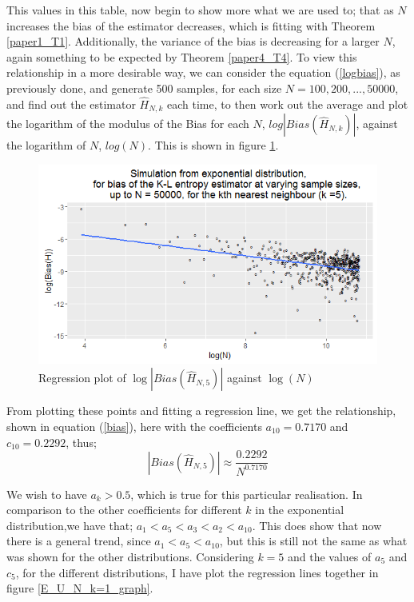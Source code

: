 \documentclass{report}
\begin{document}
This values in this table, now begin to show more what we are used to; that as $N$ increases the bias of the estimator decreases, which is fitting with Theorem \ref{paper1_T1}. Additionally, the variance of the bias is decreasing for a larger $N$, again something to be expected by Theorem \ref{paper4_T4}. To view this relationship in a more desirable way, we can consider the equation (\ref{logbias}), as previously done, and generate 500 samples, for each size $N = 100, 200, ... ,50000$, and find out the estimator $\hat{H}_{N,k}$ each time, to then work out the average and plot the logarithm of the modulus of the Bias for each $N$, $log|Bias(\hat{H}_{N,k})|$, against the logarithm of $N$, $log(N)$. This is shown in figure \ref{expo_k=5_graph}.

\begin{figure}
  \begin{center}
    \includegraphics[width=\textwidth]{./Graphs/Expo_k=5_plot.png}
  \end{center}
\caption{Regression plot of $\log|Bias(\hat{H}_{N, 5})|$ against $\log(N)$}
  \label{expo_k=5_graph}
\end{figure}

From plotting these points and fitting a regression line, we get the relationship, shown in equation (\ref{bias}), here with the coefficients $a_{10}=0.7170$ and $c_{10}=0.2292$, thus;
\begin{equation}
|Bias(\hat{H}_{N, 5})| \approx \frac{0.2292}{N^{0.7170}}\nonumber
\end{equation}

We wish to have $a_{k}>0.5$, which is true for this particular realisation. In comparison to the other coefficients for different $k$ in the exponential distribution,we have that; $a_{1} < a_{5} < a_{3} < a_{2} < a_{10}$. This does show that now there is a general trend, since $a_{1} < a_{5} < a_{10}$, but this is still not the same as what was shown for the other distributions. Considering $k=5$ and the values of $a_{5}$ and $c_{5}$, for the different distributions, I have plot the regression lines together in figure \ref{E_U_N_k=1_graph}.
\end{document}
